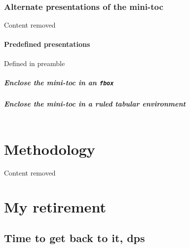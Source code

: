 \documentclass{article}
\makeatletter
\def\cs#1{\texttt{\@backslashchar#1}}
\newcommand{\insMinitoctab}[2][]{%
  \begin{center}#2
  \begin{tabular}{c}\toprule
  \begin{minipage}[c]{0.8\linewidth}
  \insertminitoc[#1]
  \end{minipage}\\ \bottomrule
  \end{tabular}
  \end{center}
}
\newcommand{\insMinitocfbox}[2][]{%
  \begin{center}#2
  \fbox{\begin{minipage}[c]{0.8\linewidth}
  \insertminitoc[#1]
  \end{minipage}}
  \end{center}
}
\makeatother
\begin{document}
\subsubsection{Alternate presentations of the mini-toc}

Content removed

\paragraph{Predefined presentations} \leavevmode

Defined in preamble

\subparagraph{Enclose the mini-toc in an \texorpdfstring{\protect\cs{fbox}}{\textbackslash{fbox}}} \leavevmode

\insMinitocfbox[CandM]{\minitocFmt}

\subparagraph{Enclose the mini-toc in a ruled tabular environment} \leavevmode

\insMinitoctab[CandM]{\minitocFmt}


\section{Methodology}

Content removed

\section{My retirement}

\subsection*{Time to get back to it, dps}
\end{document}
